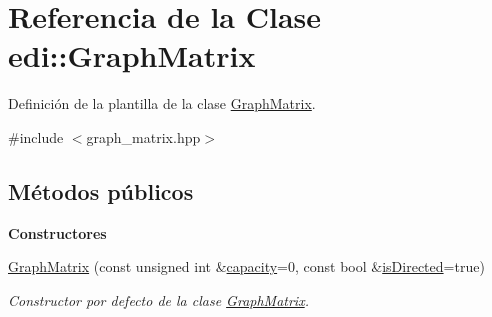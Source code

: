 \hypertarget{classedi_1_1GraphMatrix}{}\section{Referencia de la Clase edi\+:\+:Graph\+Matrix}
\label{classedi_1_1GraphMatrix}


Definición de la plantilla de la clase \hyperlink{classedi_1_1GraphMatrix}{Graph\+Matrix}.  




{\ttfamily \#include $<$graph\+\_\+matrix.\+hpp$>$}

\subsection*{Métodos públicos}
\begin{Indent}{\bf Constructores}\par
\begin{DoxyCompactItemize}
\item 
\hyperlink{classedi_1_1GraphMatrix_a190aa459192a271a0d23d7d17b61d820}{Graph\+Matrix} (const unsigned int \&\hyperlink{classedi_1_1GraphMatrix_afbcaf9d1a05c4ae921325641148c0a63}{capacity}=0, const bool \&\hyperlink{classedi_1_1GraphMatrix_ac9ecf45464596cc29ee2e70ce8342c4c}{is\+Directed}=true)
\begin{DoxyCompactList}\small\item\em Constructor por defecto de la clase \hyperlink{classedi_1_1GraphMatrix}{Graph\+Matrix}. \end{DoxyCompactList}\end{DoxyCompactItemize}
\end{Indent}
